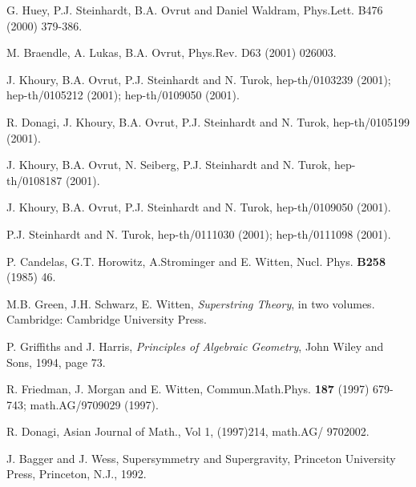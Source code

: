 \documentclass[a4paper,12pt]{article}
\numberwithin{equation}{section}
\theoremstyle{plain}
\begin{document}
\begin{thebibliography}{99}
 G. Huey, P.J. Steinhardt, B.A. Ovrut and Daniel Waldram,
        Phys.Lett. B476 (2000) 379-386.

 M. Braendle, A. Lukas, B.A. Ovrut, Phys.Rev. D63 (2001)
026003.

 J. Khoury, B.A. Ovrut, P.J. Steinhardt and N. Turok,
         hep-th/0103239 (2001); hep-th/0105212 (2001); hep-th/0109050
(2001).

 R. Donagi, J. Khoury, B.A. Ovrut, P.J. Steinhardt and N.
        Turok,  hep-th/0105199 (2001).

 J. Khoury, B.A. Ovrut, N. Seiberg, P.J. Steinhardt and N.
Turok,
        hep-th/0108187 (2001).

 J. Khoury, B.A. Ovrut, P.J. Steinhardt and N. Turok,
        hep-th/0109050 (2001).

 P.J. Steinhardt and N. Turok, hep-th/0111030 (2001);
        hep-th/0111098 (2001).

 P. Candelas, G.T. Horowitz, A.Strominger and E. Witten,
Nucl. Phys. {\bf B258} (1985) 46.

 M.B. Green, J.H. Schwarz, E. Witten,
{\em Superstring Theory}, in two volumes. Cambridge: Cambridge
University Press.

 P. Griffiths and J. Harris, {\em Principles of Algebraic
Geometry}, John Wiley and Sons, 1994, page 73.

 R. Friedman, J. Morgan and E. Witten, Commun.Math.Phys. {\bf
187 \rm} (1997) 679-743; math.AG/9709029 (1997).

 R. Donagi, Asian Journal of Math., Vol 1, (1997)214,
             math.AG/ 9702002.

 J. Bagger and J. Wess, Supersymmetry and Supergravity,
Princeton
University Press, Princeton, N.J., 1992.


\end{thebibliography}
\end{document}
